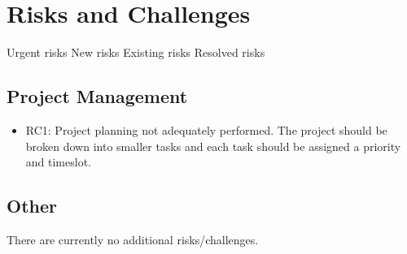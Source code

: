 \documentclass[11pt,a4paper]{article}
\begin{document}
\newpage
\section{Risks and Challenges}
{\color{red} Urgent risks}\newline
{\color{orange} New risks}\newline
{\color{brown} Existing risks}\newline
{\color{gray} Resolved risks}

\subsection{Project Management}
\begin{itemize}
\item{{\color{gray} RC1: Project planning not adequately performed. The project should be broken down into smaller tasks and each task should be assigned a priority and timeslot.}}
\end{itemize}

\subsection{Other}
There are currently no additional risks/challenges.


\newpage
% 
\end{document}
